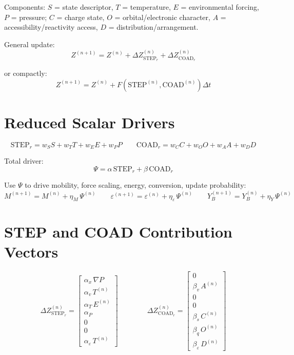 \documentclass[11pt, letterpaper]{article}
\newcommand{\STEPr}{\mathrm{STEP}_r}
\newcommand{\COADr}{\mathrm{COAD}_r}
\newcommand{\STEPn}{\mathrm{STEP}^{(n)}}
\newcommand{\COADn}{\mathrm{COAD}^{(n)}}
\begin{document}
\noindent
Components: $S$ = state descriptor, $T$ = temperature, $E$ = environmental forcing,
$P$ = pressure; $C$ = charge state, $O$ = orbital/electronic character,
$A$ = accessibility/reactivity access, $D$ = distribution/arrangement.

General update:
\[
\boxed{Z^{(n+1)} = Z^{(n)} + \Delta Z_{\STEPr}^{(n)} + \Delta Z_{\COADr}^{(n)}}
\]

or compactly:
\[
Z^{(n+1)} = Z^{(n)} + F\!\left(\STEPn, \COADn\right)\Delta t
\]

\section{Reduced Scalar Drivers}

\[
\STEPr = w_S S + w_T T + w_E E + w_P P
\qquad
\COADr = w_C C + w_O O + w_A A + w_D D
\]

Total driver:
\[
\Psi = \alpha\,\STEPr + \beta\,\COADr
\]

Use $\Psi$ to drive mobility, force scaling, energy, conversion, update probability:
\[
M^{(n+1)} = M^{(n)} + \eta_M\,\Psi^{(n)}
\qquad
\varepsilon^{(n+1)} = \varepsilon^{(n)} + \eta_\varepsilon\,\Psi^{(n)}
\qquad
Y_B^{(n+1)} = Y_B^{(n)} + \eta_Y\,\Psi^{(n)}
\]

\section{STEP and COAD Contribution Vectors}

\[
\Delta Z_{\STEPr}^{(n)} =
\begin{bmatrix}
\alpha_x\,\nabla P \\ \alpha_v\,T^{(n)} \\ \alpha_T\,E^{(n)} \\ \alpha_P \\
0 \\ 0 \\ \alpha_\varepsilon\,T^{(n)}
\end{bmatrix}
\qquad\qquad
\Delta Z_{\COADr}^{(n)} =
\begin{bmatrix}
0 \\ \beta_v\,A^{(n)} \\ 0 \\ 0 \\
\beta_s\,C^{(n)} \\ \beta_q\,O^{(n)} \\ \beta_\varepsilon\,D^{(n)}
\end{bmatrix}
\]
\end{document}
